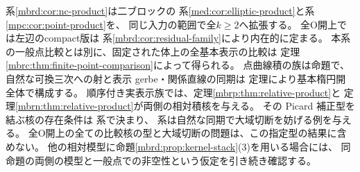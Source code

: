 系\ref{mbrd:cor:nc-product}は二ブロックの
系\ref{med:cor:elliptic-product}と系\ref{mpc:cor:point-product}を、
同じ入力の範囲で全$k\ge2$へ拡張する。
全O開上では左辺のcompact版は
系\ref{mbrd:cor:residual-family}により内在的に定まる。
本系の一般点比較とは別に、固定された体上の全基本表示の比較は
定理\ref{mbrc:thm:finite-point-comparison}によって得られる。
点曲線積の族は命題で、
自然な可換三次への射と表示 gerbe・関係直線の同期は
定理により基本楕円開全体で構成する。
順序付き実表示族では、定理\ref{mbrp:thm:relative-product}と
定理\ref{mbrn:thm:relative-product}が両側の相対積核を与える。
その Picard 補正型を結ぶ核の存在条件は
系で決まり、
系は自然な同期で大域切断を妨げる例を与える。
全O開上の全ての比較核の型と大域切断の問題は、この指定型の結果に含めない。
他の相対模型に命題\ref{mbrd:prop:kernel-stack}(3)を用いる場合には、
同命題の両側の模型と一般点での非空性という仮定を引き続き確認する。

